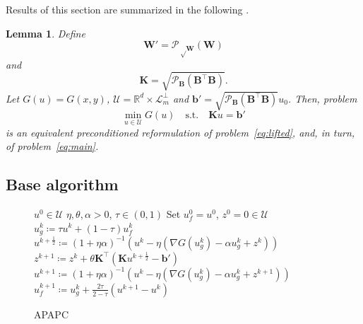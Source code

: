 \documentclass{article}
\newtheorem{lemma}{Lemma}
\newcommand{\R}{\mathbb{R}}
\newcommand{\sX}{\R^d}
\newcommand{\sY}{\R^m}
\newcommand{\sU}{{\mathcal U}}
\newcommand{\cU}{\mathcal{U}}
\newcommand{\cL}{\mathcal{L}}
\newcommand{\cP}{\mathcal{P}}
\newcommand{\mB}{\mathbf{B}}
\newcommand{\mK}{\mathbf{K}}
\newcommand{\mW}{\mathbf{W}}
\newcommand{\pW}{\mathbf{W'}}
\newcommand{\pb}{\mathbf{b'}}
\newcommand{\eqdef}{\coloneqq}
\begin{document}
Results of this section are summarized in the following .
\begin{lemma}\label{lem:prob_cheb}
  Define
  \begin{equation}\label{eq:Wcheb}
    \pW = \cP_{\sqrt\mW}(\mW)
  \end{equation}
  and
  \begin{equation}\label{eq:K}
    \mK = \sqrt{\cP_{\mB}(\mB^\top\mB)}.
  \end{equation}
Let $G(u) = G(x, y)$, 
$\sU = \sX \times \cL_m^\perp$ and
$\pb = \sqrt{\cP_{\mB}(\mB^\top \mB)}u_0$.
Then, problem
\begin{equation}\label{eq:compact}
	\min_{u\in \sU} G(u) \quad\text{s.t.}\quad \mK u = \pb
\end{equation}
is an equivalent preconditioned reformulation of problem~\eqref{eq:lifted}, and, in turn, of problem~\eqref{eq:main}. 
\end{lemma}

\subsection{Base algorithm}
\begin{figure}
\vspace{-0.45cm}
\begin{minipage}{9cm}
  \begin{algorithm}[H]
      \caption{APAPC}
  	\label{alg:apapc}
  	\begin{algorithmic}[1]
      $u^0 \in \cU$
  		$\eta,\theta,\alpha>0$, $\tau \in (0,1)$
  		\State Set $u_f^0 = u^0$, $z^0 = 0 \in \cU$
  		\State $u_g^k \eqdef \tau u^k +  (1-\tau)u_f^k$\label{alg:apapc:line:x:1}
  		\State $u^{k+\frac{1}{2}} \eqdef (1+\eta\alpha)^{-1}(u^k - \eta (\nabla G(u_g^k) - \alpha  u_g^k + z^k))$\label{alg:apapc:line:x:2}
  		\State $z^{k+1} \eqdef z^k  + \theta \mK^\top (\mK u^{k+\frac{1}{2}} - \pb)$ \label{alg:apapc:line:z}
  		\State $u^{k+1} \eqdef (1+\eta\alpha)^{-1}(u^k - \eta (\nabla G(u_g^k) - \alpha  u_g^k + z^{k+1}))$\label{alg:apapc:line:x:3}
  		\State $u_f^{k+1} \eqdef u_g^k + \tfrac{2\tau}{2-\tau}(u^{k+1} - u^k)$\label{alg:apapc:line:x:4}
  		\EndFor
  	\end{algorithmic}
  \end{algorithm}
\end{minipage}
\end{figure}
\end{document}
